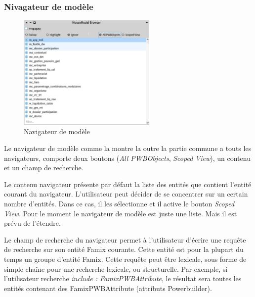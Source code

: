 \documentclass[a4paper]{article}
\begin{document}
\subsubsection{Nivagateur de modèle}
\begin{figure}[htbp]
  \begin{center}
  \includegraphics[width=0.6\textwidth]{./figures/modelBrowser.png}
  \caption{Navigateur de modèle}
  \label{fig:modelBrowser}
\end{center}
\vspace{-0.3cm}
\end{figure}
Le navigateur de modèle comme la montre la  outre la partie commune a touts les navigateurs, comporte deux boutons (\textit{All PWBObjects}, \textit{Scoped View}), un contenu et un champ de recherche.

Le contenu navigateur présente par défaut la liste des entités que contient l'entité courant du navigateur. 
L'utilisateur peut décider de se concentrer sur un certain nombre d'entités. Dans ce cas, il les sélectionne et il active le bouton \textit{Scoped View}.
Pour le moment le navigateur de modèle est juste une liste. Mais il est prévu de l'étendre.

Le champ de recherche du navigateur permet à l'utilisateur d'écrire une requête de recherche sur son entité Famix courante.
Cette entité est pour la plupart du temps un groupe d'entité Famix.
Cette requête peut être lexicale, sous forme de simple chaîne pour une recherche lexicale, ou structurelle.
Par exemple, si l'utilisateur recherche \textit{include : FamixPWBAttribute}, le résultat sera toutes les entités contenant des FamixPWBAttribute (attributs Powerbuilder).
\end{document}
